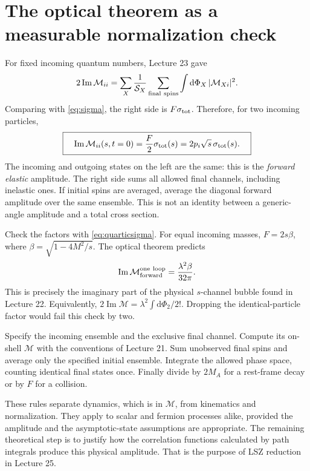 \documentclass[11pt]{article}
\newcommand{\dd}{\mathrm d}
\newcommand{\module}[1]{\clearpage\section{#1}}
\newcommand{\cM}{\mathcal M}
\newcommand{\cS}{\mathcal S}
\begin{document}
\module{The optical theorem as a measurable normalization check}
For fixed incoming quantum numbers, Lecture 23 gave
\begin{equation}
 2\operatorname{Im}\cM_{ii}
 =\sum_X\frac1{\cS_X}\sum_{\rm final\ spins}
 \int\dd\Phi_X\,|\cM_{Xi}|^2.
\end{equation}
Comparing with \eqref{eq:sigma}, the right side is \(F\sigma_{\rm tot}\).
Therefore, for two incoming particles,
\begin{equation}
 \boxed{\quad\operatorname{Im}\cM_{ii}(s,t=0)
 =\frac{F}{2}\sigma_{\rm tot}(s)
 =2p_i\sqrt{s}\,\sigma_{\rm tot}(s).\quad}
 \label{eq:opticalrate}
\end{equation}
The incoming and outgoing states on the left are the same: this is the
\emph{forward elastic} amplitude. The right side sums all allowed final
channels, including inelastic ones. If initial spins are averaged, average
the diagonal forward amplitude over the same ensemble. This is not an
identity between a generic-angle amplitude and a total cross section.

Check the factors with \eqref{eq:quarticsigma}. For equal incoming masses,
\(F=2s\beta\), where \(\beta=\sqrt{1-4M^2/s}\). The optical theorem predicts
\begin{equation}
 \operatorname{Im}\cM_{\rm forward}^{\rm one\ loop}
 =\frac{\lambda^2\beta}{32\pi}.
\end{equation}
This is precisely the imaginary part of the physical \(s\)-channel bubble
found in Lecture 22. Equivalently,
\(2\operatorname{Im}\cM=\lambda^2\int\dd\Phi_2/2!\).
Dropping the identical-particle factor would fail this check by two.

\begin{keyidea}
Specify the incoming ensemble and the exclusive final channel.
Compute its on-shell \(\cM\) with the conventions of Lecture 21.
Sum unobserved final spins and average only the specified initial ensemble.
Integrate the allowed phase space, counting identical final states once.
Finally divide by \(2M_A\) for a rest-frame decay or by \(F\) for a collision.
\end{keyidea}
These rules separate dynamics, which is in \(\cM\), from kinematics and
normalization. They apply to scalar and fermion processes alike, provided
the amplitude and the asymptotic-state assumptions are appropriate.
The remaining theoretical step is to justify how the correlation
functions calculated by path integrals produce this physical amplitude.
That is the purpose of LSZ reduction in Lecture 25.
\end{document}
